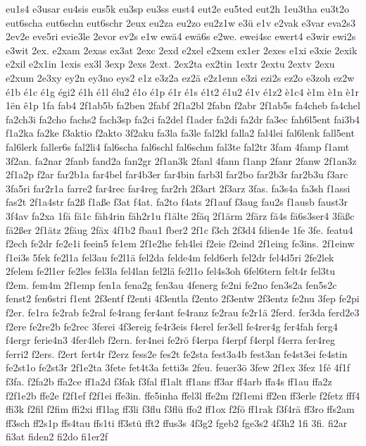 {eu1s4
e3usar
eu4sis
eus5k
eu3sp
eu3ss
eust4
eut2e
eu5ted
eut2h
1eu3tha
eu3t2o
eut6scha
eut6schn
eut6schr
2eux
eu2za
eu2zo
eu2z1w
e3ü
e1v
e2vak
e3var
eva2s3
2ev2e
eve5ri
evie3le
2evor
ev2s
e1w
ewä4
ewä6s
e2we.
ewei4sc
ewert4
e3wir
ewi2s
e3wit
2ex.
e2xam
2exas
ex3at
2exc
2exd
e2xel
e2xem
ex1er
2exes
e1xi
e3xie
2exik
e2xil
e2x1in
1exis
ex3l
3exp
2exs
2ext.
2ex2ta
ex2tin
1extr
2extu
2extv
2exu
e2xum
2e3xy
ey2n
ey3no
eys2
e1z
e3z2a
ez2ä
e2z1enn
e3zi
ezi2s
ez2o
e3zoh
ez2w
é1b
é1c
é1g
égi2
é1h
é1l
élu2
é1o
é1p
é1r
é1s
é1t2
é1u2
é1v
é1z2
è1c4
è1m
è1n
è1r
1ën
ê1p
1fa
fab4
2f1ab5b
fa2ben
2fabf
2f1a2bl
2fabn
f2abr
2f1ab5s
fa4cheb
fa4chel
fa2ch3i
fa2cho
fachs2
fach3sp
fa2ci
fa2del
f1ader
fa2di
fa2dr
fa3ec
fah6l5ent
fai3b4
f1a2ka
fa2ke
f3aktio
f2akto
3f2aku
fa3la
fa3le
fal2kl
falla2
fal4lei
fal6lenk
fall5ent
fal6lerk
faller6s
fal2li4
fal6scha
fal6schl
fal6schm
fal3te
fal2tr
3fam
4famp
f1amt
3f2an.
fa2nar
2fanb
fand2a
fan2gr
2f1an3k
2fanl
4fann
f1anp
2fanr
2fanw
2f1an3z
2f1a2p
f2ar
far2b1a
far4bel
far4b3er
far4bin
farb3l
far2bo
far2b3r
far2b3u
f3arc
3fa5ri
far2r1a
farre2
far4rec
far4reg
far2rh
2f3art
2f3arz
3fas.
fa3s4a
fa3sh
f1assi
fas2t
2f1a4str
fa2ß
f1aße
f3at
f4at.
fa2to
f4ats
2f1auf
f3aug
fau2s
f1ausb
faust3r
3f4av
fa2xa
1fä
fä1c
fäh4rin
fäh2r1u
f1älte
2fäq
2f1ärm
2färz
fä4s
fä6s3ser4
3fäßc
fä2ßer
2f1ätz
2fäug
2fäx
4f1b2
fbau1
fber2
2f1c
f3ch
2f3d4
fdien4e
1fe
3fe.
featu4
f2ech
fe2dr
fe2e1i
feein5
fe1em
2f1e2he
feh4lei
f2eie
f2eind
2f1eing
fe3ins.
2f1einw
f1ei3s
5fek
fe2l1a
fel3au
fe2l1ä
fel2da
felde4m
feld6erh
fel2dr
fel4d5ri
2fe2lek
2felem
fe2l1er
fe2les
fel3la
fel4lan
fel2lä
fe2l1o
fel4s3oh
6fel6tern
felt4r
fel3tu
f2em.
fem4m
2f1emp
fen1a
fena2g
fen3au
4fenerg
fe2ni
fe2no
fen3s2a
fen5s2c
fenst2
fen6stri
f1ent
2f3entf
f2enti
4f3entla
f2ento
2f3entw
2f3entz
fe2nu
3fep
fe2pi
f2er.
fe1ra
fe2rab
fe2ral
fe4rang
fer4ant
fe4ranz
fe2rau
fe2r1ä
2ferd.
fer3da
ferd2e3
f2ere
fe2re2b
fe2rec
3ferei
4f3ereig
fe4r3eis
f4erel
fer3ell
fe4rer4g
fer4fah
ferg4
f4ergr
ferie4n3
4fer4leb
f2ern.
fer4nei
fe2rö
f4erpa
f4erpf
f4erpl
f4erra
fer4reg
ferri2
f2ers.
f2ert
fert4r
f2erz
fess2e
fes2t
fe2sta
fest3a4b
fest3an
fe4st3ei
fe4stin
fe2st1o
fe2st3r
2f1e2ta
3fete
fet4t3a
fetti3s
2feu.
feuer3ö
3few
2f1ex
3fez
1fé
4f1f
f3fa.
f2fa2b
ffa2ce
ff1a2d
f3fak
f3fal
ff1alt
ff1ans
ff3ar
ff4arb
ffa4s
ff1au
ffa2z
f2f1e2b
ffe2e
f2f1ef
f2f1ei
ffe3in.
ffe5inha
ffel3l
ffe2m
f2f1emi
ff2en
ff3erle
f2fetz
fff4
ffi3k
f2fil
f2fim
ffi2xi
ff1lag
ff3li
f3flu
f3flü
ffo2
ff1ox
f2fö
ff1rak
f3f4rä
ff3ro
ffs2am
ff3sch
ff2s1p
ffs4tau
ffs1ti
ff3stü
fft2
ffus3s
4f3g2
fgeb2
fge3s2
4f3h2
1fi
3fi.
fi2ar
fi3at
fiden2
fi2do
fi1er2f
}
